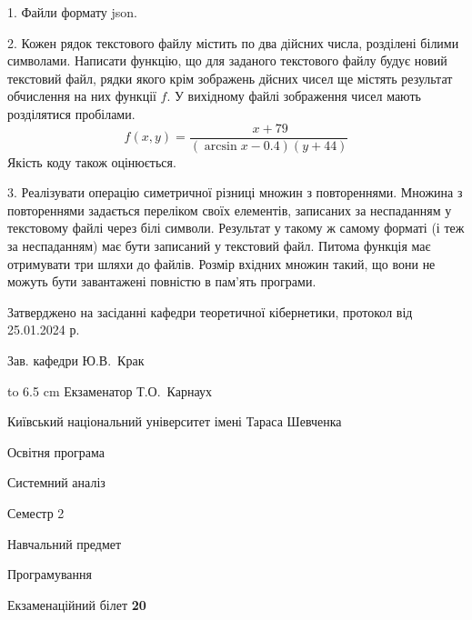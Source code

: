 \documentclass[12pt, ukrainian]{article}
\begin{document}
{%
1. Файли формату json.%
\par
\vspace{2mm}

2. Кожен рядок текстового файлу містить по два дійсних числа, розділені білими символами.
Написати функцію, що для заданого текстового файлу будує новий текстовий файл, рядки якого крім зображень дйсних чисел ще містять результат обчислення на них функції $f$. У вихідному файлі зображення чисел мають розділятися пробілами. 
$$f(x, y) =\frac{\ x + 79}{(\arcsin x - 0.4) (y + 44)}$$ 
Якість коду також оцінюється.

\par
\vspace{2mm}

3. Реалізувати операцію симетричної різниці множин з повтореннями. Множина з повтореннями задається переліком своїх елементів, записаних за неспаданням у текстовому файлі через білі символи. Результат у такому ж самому форматі (і теж за неспаданням) має бути записаний у текстовий файл. Питома функція має отримувати три шляхи до файлів. Розмір вхідних множин такий, що вони не можуть бути завантажені повністю в пам’ять програми.

}
{\smallskip\smallskip \begin {scriptsize} Затверджено на засіданні кафедри теоретичної кібернетики, протокол   від   25.01.2024 р.\par\smallskip\smallskip\smallskip\smallskip
{\parbox {6.5 cm} {Зав. кафедри \dotfill Ю.В.~Крак}}\hspace {0.7cm} {\hbox to 6.5 cm { Екзаменатор \dotfill Т.О.~Карнаух}} \end{scriptsize}}
\vspace{0.9cm}
{{\begin {scriptsize}\par
{ \center  Київський національний університет імені Тараса Шевченка \par}
{\parbox {5 cm}{Освітня програма \hfill}{\parbox {7 cm}{Системний аналіз\hfill}}\parbox {6 cm}{\hfill Семестр 2}}\par
{\parbox {5 cm} {Навчальний предмет \hfill}\parbox {7 cm}{Програмування \hfill}\parbox {6cm}{\hfill}\par}\vspace{-15pt} \end{scriptsize}}{\center Екзаменаційний білет \No \textbf { 20 }\par}}
\end{document}
